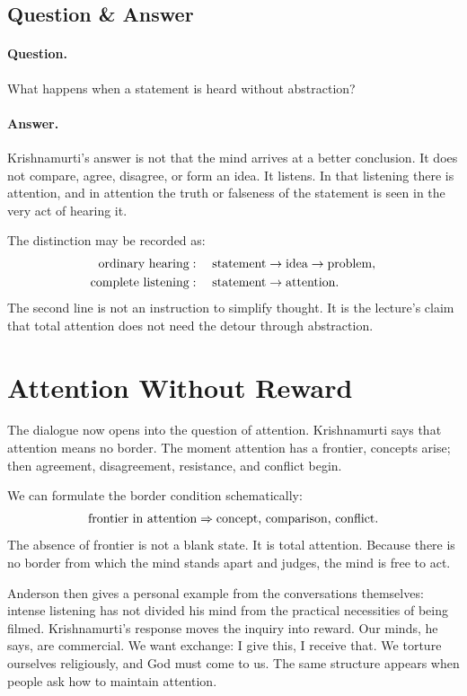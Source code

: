 \subsection{Question \& Answer}

\paragraph{Question.}
What happens when a statement is heard without abstraction?

\paragraph{Answer.}
Krishnamurti's answer is not that the mind arrives at a better conclusion. It does not compare, agree, disagree, or form an idea. It listens. In that listening there is attention, and in attention the truth or falseness of the statement is seen in the very act of hearing it.

The distinction may be recorded as:
\begin{align}
\hbox{ordinary hearing}
&:\quad
\hbox{statement}\to\hbox{idea}\to\hbox{problem},\\
\hbox{complete listening}
&:\quad
\hbox{statement}\to\hbox{attention}.
\end{align}
The second line is not an instruction to simplify thought. It is the lecture's claim that total attention does not need the detour through abstraction.

\section{Attention Without Reward}

The dialogue now opens into the question of attention. Krishnamurti says that attention means no border. The moment attention has a frontier, concepts arise; then agreement, disagreement, resistance, and conflict begin.

We can formulate the border condition schematically:
\begin{equation}
\hbox{frontier in attention}
\Rightarrow
\hbox{concept, comparison, conflict}.
\end{equation}
The absence of frontier is not a blank state. It is total attention. Because there is no border from which the mind stands apart and judges, the mind is free to act.

Anderson then gives a personal example from the conversations themselves: intense listening has not divided his mind from the practical necessities of being filmed. Krishnamurti's response moves the inquiry into reward. Our minds, he says, are commercial. We want exchange: I give this, I receive that. We torture ourselves religiously, and God must come to us. The same structure appears when people ask how to maintain attention.

